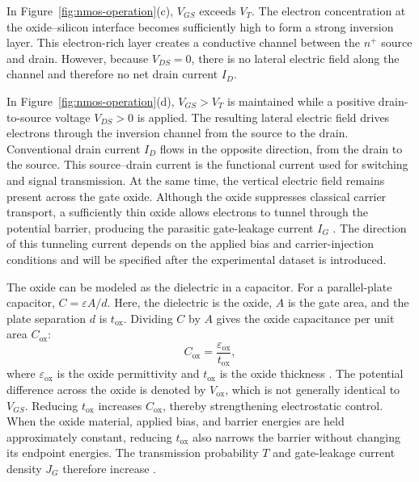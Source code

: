 \documentclass[12pt]{article}
\begin{document}
In Figure~\ref{fig:nmos-operation}(c), \(V_{GS}\) exceeds \(V_T\). The electron concentration at the oxide--silicon interface becomes sufficiently high to form a strong inversion layer. This electron-rich layer creates a conductive channel between the \(n^+\) source and drain. However, because \(V_{DS}=0\), there is no lateral electric field along the channel and therefore no net drain current \(I_D\).

In Figure~\ref{fig:nmos-operation}(d), \(V_{GS}>V_T\) is maintained while a positive drain-to-source voltage \(V_{DS}>0\) is applied. The resulting lateral electric field drives electrons through the inversion channel from the source to the drain. Conventional drain current \(I_D\) flows in the opposite direction, from the drain to the source. This source--drain current is the functional current used for switching and signal transmission. At the same time, the vertical electric field remains present across the gate oxide. Although the oxide suppresses classical carrier transport, a sufficiently thin oxide allows electrons to tunnel through the potential barrier, producing the parasitic gate-leakage current \(I_G\) \cite{green2001review}. The direction of this tunneling current depends on the applied bias and carrier-injection conditions and will be specified after the experimental dataset is introduced.

The oxide can be modeled as the dielectric in a capacitor. For a parallel-plate capacitor, \(C=\varepsilon A/d\). Here, the dielectric is the oxide, \(A\) is the gate area, and the plate separation \(d\) is \(t_{\mathrm{ox}}\). Dividing \(C\) by \(A\) gives the oxide capacitance per unit area \(C_{\mathrm{ox}}\):
\begin{equation}
    C_{\mathrm{ox}}=\frac{\varepsilon_{\mathrm{ox}}}{t_{\mathrm{ox}}},
\end{equation}
where \(\varepsilon_{\mathrm{ox}}\) is the oxide permittivity and \(t_{\mathrm{ox}}\) is the oxide thickness \cite{taur2009}. The potential difference across the oxide is denoted by \(V_{\mathrm{ox}}\), which is not generally identical to \(V_{GS}\). Reducing \(t_{\mathrm{ox}}\) increases \(C_{\mathrm{ox}}\), thereby strengthening electrostatic control. When the oxide material, applied bias, and barrier energies are held approximately constant, reducing \(t_{\mathrm{ox}}\) also narrows the barrier without changing its endpoint energies. The transmission probability \(T\) and gate-leakage current density \(J_G\) therefore increase \cite{green2001review}.
\end{document}
